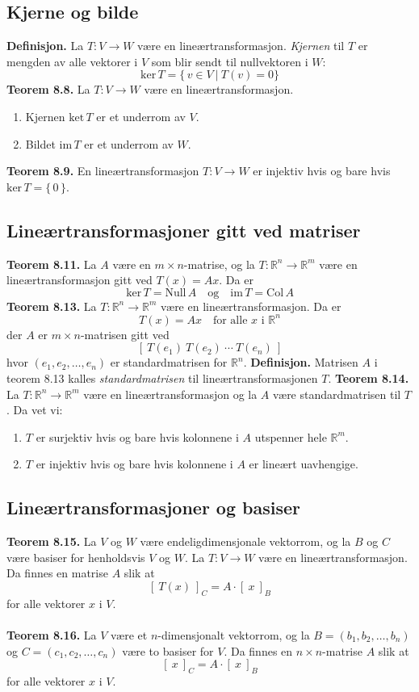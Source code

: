 \documentclass{article}
\begin{document}
\subsection{Kjerne og bilde}
\textbf{Definisjon.} La $T: V \rightarrow W$ være en lineærtransformasjon. \textit{Kjernen} til $T$ er mengden av alle vektorer i $V$ som blir sendt til nullvektoren i $W$:
\[ \text{ker}\,T = \{\,v \in V \ | \ T(v) = 0 \} \]
\textbf{Teorem 8.8.} La $T: V \rightarrow W$ være en lineærtransformasjon.
\begin{enumerate}
    \item Kjernen $\text{ket}\,T$ er et underrom av $V$.
    \item Bildet $\text{im}\,T$ er et underrom av $W$.
\end{enumerate}
\textbf{Teorem 8.9.} En lineærtransformasjon $T: V \rightarrow W$ er injektiv hvis og bare hvis $\text{ker}\,T=\{\,0\,\}$.


\subsection{Lineærtransformasjoner gitt ved matriser}
\textbf{Teorem 8.11.} La $A$ være en $m \times n$-matrise, og la $T: \mathbb{R}^n \rightarrow \mathbb{R}^m$ være en lineærtransformasjon gitt ved $T(x) = Ax$. Da er
\[ \text{ker}\,T = \text{Null}\,A \quad \text{og} \quad \text{im}\,T=\text{Col}\,A \]
\textbf{Teorem 8.13.} La $T: \mathbb{R}^n \rightarrow \mathbb{R}^m$ være en lineærtransformasjon. Da er
\[ T(x) = Ax \quad \text{for alle } x \text{ i } \mathbb{R}^n \]
der $A$ er $m \times n$-matrisen gitt ved
\[ [ \ T(e_1) \ T(e_2) \ \cdots \ T(e_n) \ ] \]
hvor $(e_1, e_2, \dots, e_n)$ er standardmatrisen for $\mathbb{R}^n$.
\textbf{Definisjon.} Matrisen $A$ i teorem 8.13 kalles \textit{standardmatrisen} til lineærtransformasjonen $T$.
\textbf{Teorem 8.14.} La $T: \mathbb{R}^n \rightarrow \mathbb{R}^m$ være en lineærtransformasjon og la $A$ være standardmatrisen til $T$. Da vet vi:
\begin{enumerate}
    \item $T$ er surjektiv hvis og bare hvis kolonnene i $A$ utspenner hele $\mathbb{R}^m$.
    \item $T$ er injektiv hvis og bare hvis kolonnene i $A$ er lineært uavhengige.
\end{enumerate}


\subsection{Lineærtransformasjoner og basiser}
\textbf{Teorem 8.15.} La $V$ og $W$ være endeligdimensjonale vektorrom, og la $B$ og $C$ være basiser for henholdsvis $V$ og $W$. La $T: V \rightarrow W$ være en lineærtransformasjon. Da finnes en matrise $A$ slik at
\[ [ \ T(x) \ ]_C = A \cdot [ \ x \ ]_B \]
for alle vektorer $x$ i $V$.
\\\\
\textbf{Teorem 8.16.} La $V$ være et $n$-dimensjonalt vektorrom, og la $B = (b_1, b_2, \dots, b_n)$ og $C = (c_1, c_2, \dots, c_n)$ være to basiser for $V$. Da finnes en $n \times n$-matrise $A$ slik at
\[ [ \ x \ ]_C = A \cdot [ \ x \ ]_B \]
for alle vektorer $x$ i $V$.
\end{document}
